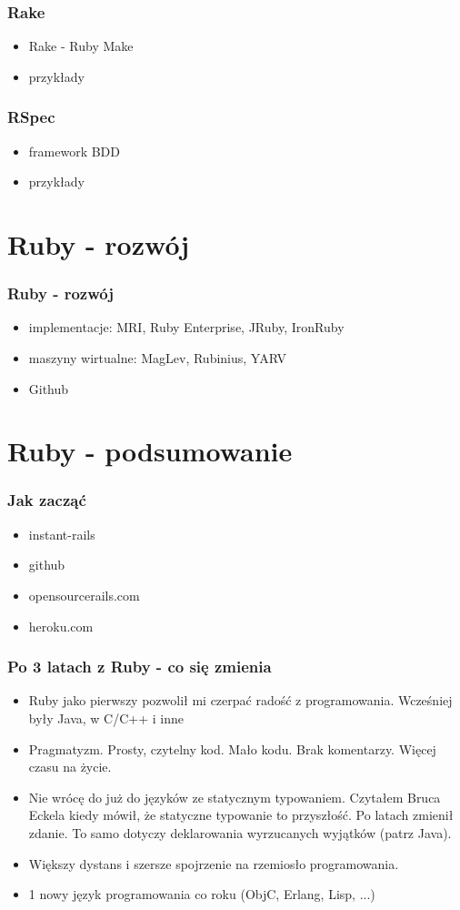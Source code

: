 \documentclass[12t]{beamer}
\begin{document}
\begin{frame}
  \frametitle{Rake}
  \begin{itemize}
  \item Rake - Ruby Make
  \item przykłady
  \end{itemize}
\end{frame}

\begin{frame}
  \frametitle{RSpec}
  \begin{itemize}
  \item framework BDD
  \item przykłady
  \end{itemize}
\end{frame}

\section{Ruby - rozwój}
\begin{frame}
  \frametitle{Ruby - rozwój}
  \begin{itemize}
  \item implementacje: MRI, Ruby Enterprise, JRuby, IronRuby
  \item maszyny wirtualne: MagLev, Rubinius, YARV
  \item Github
  \end{itemize}
\end{frame}

\section{Ruby - podsumowanie}
\begin{frame}
  \frametitle{Jak zacząć}
  \begin{itemize}
  \item instant-rails
  \item github
  \item opensourcerails.com
  \item heroku.com
  \end{itemize}
\end{frame}

\begin{frame}
  \frametitle{Po 3 latach z Ruby - co się zmienia}
  \begin{itemize}
  \item Ruby jako pierwszy pozwolił mi czerpać radość z
    programowania. Wcześniej były Java, w C/C++ i inne
  \item Pragmatyzm. Prosty, czytelny kod. Mało kodu. Brak
    komentarzy. Więcej czasu na życie.
  \item Nie wrócę do już do języków ze statycznym typowaniem. Czytałem
    Bruca Eckela kiedy mówił, że statyczne typowanie to przyszłość. Po
    latach zmienił zdanie. To samo dotyczy deklarowania wyrzucanych
    wyjątków (patrz Java).
  \item Większy dystans i szersze spojrzenie na rzemiosło programowania.
  \item 1 nowy język programowania co roku (ObjC, Erlang, Lisp, ...)
  \end{itemize}
\end{frame}
\end{document}

